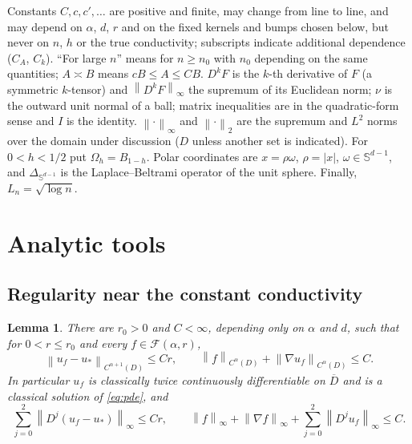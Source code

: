 \documentclass[11pt]{article}
\numberwithin{equation}{section}
\newtheorem{lemma}[theorem]{Lemma}
\newcommand{\norm}[1]{\left\|#1\right\|}
\newcommand{\Sp}{\mathbb S^{d-1}}
\begin{document}
Constants $C,c,c',\dots$ are positive and finite, may change from line
to line, and may depend on $\alpha$, $d$, $r$ and on the fixed kernels
and bumps chosen below, but never on $n$, $h$ or the true conductivity;
subscripts indicate additional dependence ($C_A$, $C_k$). ``For large
$n$'' means for $n\ge n_0$ with $n_0$ depending on the same quantities;
$A\asymp B$ means $cB\le A\le CB$. $D^kF$ is the $k$-th derivative of
$F$ (a symmetric $k$-tensor) and $\norm{D^kF}_\infty$ the supremum of
its Euclidean norm; $\nu$ is the outward unit normal of a ball; matrix
inequalities are in the quadratic-form sense and $I$ is the identity.
$\norm\cdot_\infty$ and $\norm\cdot_2$ are the supremum and $L^2$
norms over the domain under discussion ($D$ unless another set is
indicated). For $0<h<1/2$ put $\Omega_h=B_{1-h}$. Polar coordinates
are $x=\rho\omega$, $\rho=|x|$, $\omega\in\Sp$, and $\Delta_{\Sp}$ is
the Laplace--Beltrami operator of the unit sphere. Finally,
$L_n=\sqrt{\log n}$.

\section{Analytic tools}\label{sec:tools}

\subsection{Regularity near the constant conductivity}

\begin{lemma}\label{lem:regularity}
There are $r_0>0$ and $C<\infty$, depending only on $\alpha$ and $d$,
such that for $0<r\le r_0$ and every $f\in\mathcal F(\alpha,r)$,
\begin{equation}\label{eq:regularity}
 \norm{u_f-u_*}_{C^{\alpha+1}(D)}\le Cr,\qquad
 \norm{f}_{C^\alpha(D)}+\norm{\nabla u_f}_{C^\alpha(D)}\le C.
\end{equation}
In particular $u_f$ is classically twice continuously differentiable
on $\overline D$ and is a classical solution of \eqref{eq:pde}, and
\begin{equation}\label{eq:classical}
 \sum_{j=0}^2\norm{D^j(u_f-u_*)}_\infty\le Cr,\qquad
 \norm f_\infty+\norm{\nabla f}_\infty
 +\sum_{j=0}^{2}\norm{D^ju_f}_\infty\le C.
\end{equation}
\end{lemma}
\end{document}
